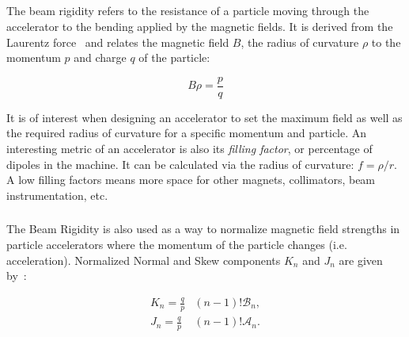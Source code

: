 \subsection{}

\subsubsection{}

The beam rigidity refers to the resistance of a particle moving through the accelerator to the
bending applied by the magnetic fields. It is derived from the Laurentz force~\cite{dilly_corrections_2022}
and relates the magnetic field $B$, the radius of curvature $\rho$ to the momentum $p$ and charge $q$
of the particle:

\begin{equation}
    B \rho = \frac{p}{q}
    \label{eq:magnetic_fields_beam_rigidity}
\end{equation}

It is of interest when designing an accelerator to set the maximum field as well as the required
radius of curvature for a specific momentum and particle.
An interesting metric of an accelerator is also its \textit{filling factor}, or percentage of
dipoles in the machine. It can be calculated via the radius of curvature: $f = \rho / r$. A low 
filling factors means more space for other magnets, collimators, beam instrumentation, etc.

\subsubsection{}

The Beam Rigidity is also used as a way to normalize magnetic field strengths in particle
accelerators where the momentum of the particle changes (i.e. acceleration).
Normalized Normal and Skew components $K_n$ and $J_n$ are given by~\cite{wolf_engineering_2001}:

\begin{equation}
    \begin{aligned}
        K_n =  \frac{q}{p} &(n-1)! \mathcal{B}_n, \\ 
        J_n =  \frac{q}{p} &(n-1)! \mathcal{A}_n.
    \end{aligned}
    \label{eq:magnetic_fields_normalized}
\end{equation}



